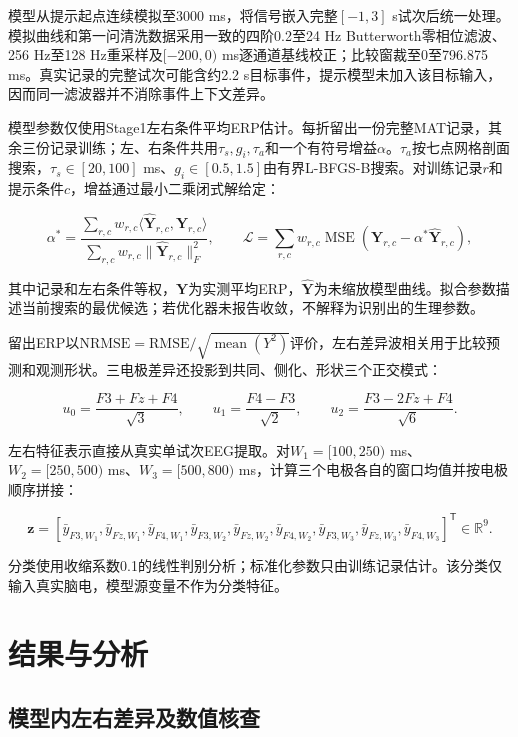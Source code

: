 \documentclass[12pt,a4paper]{article}
\begin{document}
模型从提示起点连续模拟至3000 ms，将信号嵌入完整\([-1,3]\) s试次后统一处理。模拟曲线和第一问清洗数据采用一致的四阶0.2至24 Hz Butterworth零相位滤波、256 Hz至128 Hz重采样及\([-200,0)\) ms逐通道基线校正；比较窗裁至0至796.875 ms。真实记录的完整试次可能含约2.2 s目标事件，提示模型未加入该目标输入，因而同一滤波器并不消除事件上下文差异。

模型参数仅使用Stage1左右条件平均ERP估计。每折留出一份完整MAT记录，其余三份记录训练；左、右条件共用\(\tau_s,g_i,\tau_a\)和一个有符号增益\(\alpha\)。\(\tau_a\)按七点网格剖面搜索，\(\tau_s\in[20,100]\) ms、\(g_i\in[0.5,1.5]\)由有界L-BFGS-B搜索。对训练记录\(r\)和提示条件\(c\)，增益通过最小二乘闭式解给定：

\[
\alpha^*=\frac{\sum_{r,c}w_{r,c}\langle\widehat{\mathbf Y}_{r,c},\mathbf Y_{r,c}\rangle}
{\sum_{r,c}w_{r,c}\lVert\widehat{\mathbf Y}_{r,c}\rVert_F^2},\qquad
\mathcal L=\sum_{r,c}w_{r,c}\operatorname{MSE}\!\left(\mathbf Y_{r,c}-\alpha^*\widehat{\mathbf Y}_{r,c}\right),
\]

其中记录和左右条件等权，\(\mathbf Y\)为实测平均ERP，\(\widehat{\mathbf Y}\)为未缩放模型曲线。拟合参数描述当前搜索的最优候选；若优化器未报告收敛，不解释为识别出的生理参数。

留出ERP以\(\mathrm{NRMSE}=\mathrm{RMSE}/\sqrt{\operatorname{mean}(Y^2)}\)评价，左右差异波相关用于比较预测和观测形状。三电极差异还投影到共同、侧化、形状三个正交模式：

\[
u_0=\frac{F3+Fz+F4}{\sqrt3},\qquad
u_1=\frac{F4-F3}{\sqrt2},\qquad
u_2=\frac{F3-2Fz+F4}{\sqrt6}.
\]

左右特征表示直接从真实单试次EEG提取。对\(W_1=[100,250)\) ms、\(W_2=[250,500)\) ms、\(W_3=[500,800)\) ms，计算三个电极各自的窗口均值并按电极顺序拼接：

\[
\mathbf z=\left[
\bar y_{F3,W_1},\bar y_{Fz,W_1},\bar y_{F4,W_1},
\bar y_{F3,W_2},\bar y_{Fz,W_2},\bar y_{F4,W_2},
\bar y_{F3,W_3},\bar y_{Fz,W_3},\bar y_{F4,W_3}
\right]^{\mathsf T}\in\mathbb R^9.
\]

分类使用收缩系数0.1的线性判别分析；标准化参数只由训练记录估计。该分类仅输入真实脑电，模型源变量不作为分类特征。

\hypertarget{ux7ed3ux679cux4e0eux5206ux6790}{%
\section{结果与分析}\label{ux7ed3ux679cux4e0eux5206ux6790}}

\hypertarget{ux6a21ux578bux5185ux5de6ux53f3ux5deeux5f02ux53caux6570ux503cux6838ux67e5}{%
\subsection{模型内左右差异及数值核查}\label{ux6a21ux578bux5185ux5de6ux53f3ux5deeux5f02ux53caux6570ux503cux6838ux67e5}}
\end{document}
